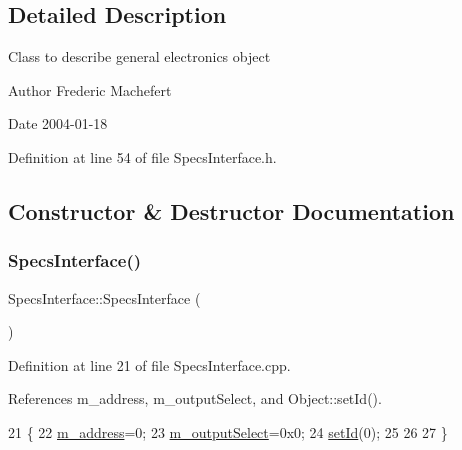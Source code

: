 \subsection{Detailed Description}
Class to describe general electronics object

\begin{DoxyAuthor}{Author}
Frederic Machefert 
\end{DoxyAuthor}
\begin{DoxyDate}{Date}
2004-\/01-\/18 
\end{DoxyDate}


Definition at line 54 of file Specs\+Interface.\+h.



\subsection{Constructor \& Destructor Documentation}
\mbox{\label{classSpecsInterface_a33b267de6a6447965f068adea3aba138}} 
\subsubsection{\texorpdfstring{Specs\+Interface()}{SpecsInterface()}}
{\footnotesize\ttfamily Specs\+Interface\+::\+Specs\+Interface (\begin{DoxyParamCaption}{ }\end{DoxyParamCaption})}



Definition at line 21 of file Specs\+Interface.\+cpp.



References m\+\_\+address, m\+\_\+output\+Select, and Object\+::set\+Id().


\begin{DoxyCode}
21                               \{
22   \hyperlink{classSpecsInterface_a4064da5ca6e0a172363967c4acc0b365}{m\_address}=0;
23   \hyperlink{classSpecsInterface_a660cb4112ce1c071f277cb6ec115b411}{m\_outputSelect}=0x0;
24   \hyperlink{classObject_a398fe08cba594a0ce6891d59fe4f159f}{setId}(0);
25 
26 
27 \}
\end{DoxyCode}
\mbox{\label{classSpecsInterface_a914c632c299fa854be1ff9387b4d8939}} 

